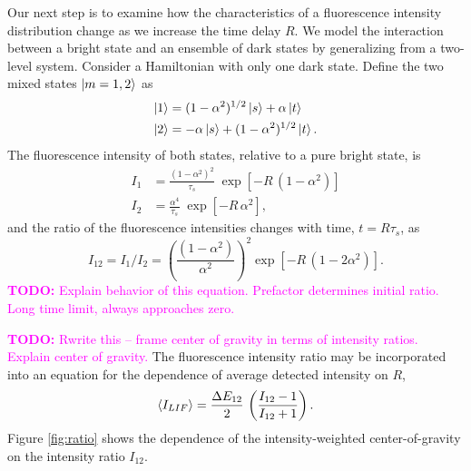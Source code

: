 \documentclass[12pt]{mitthesis}
\newcommand{\TODO} [1]{\textcolor{magenta}{\textbf{TODO:} #1}}
\begin{document}
Our next step is to examine how the characteristics of a
fluorescence intensity distribution change as we increase the time delay
$R$.  We model the interaction between a bright state and an
ensemble of dark states by generalizing from a two-level system.
Consider a Hamiltonian with only one dark state.  Define the two mixed
states $\mathinner{|{m=1,2}\rangle}$ as
\begin{equation}
  \begin{split}
    \mathinner{|{1}\rangle} &=  (1 - \alpha^2)^{1/2} \mathinner{|{s}\rangle} + \alpha \mathinner{|{t}\rangle}\\
    \mathinner{|{2}\rangle} &= -\alpha \mathinner{|{s}\rangle} + (1 - \alpha^2)^{1/2} \mathinner{|{t}\rangle}.
  \end{split}
\end{equation}
The fluorescence intensity of both states, relative to a pure bright
state, is
\begin{equation}
  \begin{split}
    I_1 &= \frac{(1 - \alpha^2)^2}{\tau_s} \; \exp 
          \left[
            - R \, (1 - \alpha^2)
          \right]\\
    I_2 &= \frac{\alpha^4}{\tau_s} \; \exp 
          \left[
            - R \, \alpha^2
          \right],
  \end{split}
\end{equation}
and the ratio of the fluorescence intensities changes with time,
$t=R\tau_s$, as
\begin{equation}
  I_{12} = I_1 / I_2 = 
  \left(
    \frac{(1 - \alpha^2)}{\alpha^2}
  \right)^2
  \exp
  \left[
    - R \, (1 - 2\alpha^2)
  \right].
\end{equation}  \TODO{Explain behavior of this equation.  Prefactor
  determines initial ratio.  Long time limit, always approaches zero.}

\TODO{Rwrite this -- frame center of gravity in terms of intensity
  ratios.  Explain center of gravity.}  The fluorescence intensity
ratio may be incorporated into an equation for the dependence of
average detected intensity on $R$,
\begin{equation}
  \label{eq:ratio}
  \mathinner{\langle{I_{LIF}}\rangle} = 
  \frac{\Delta E_{12}}{2} \,
  \left(
    \frac{I_{12}-1}{I_{12}+1}
  \right).
\end{equation}
Figure \ref{fig:ratio} shows the dependence of the intensity-weighted
center-of-gravity on the intensity ratio $I_{12}$.
\end{document}

